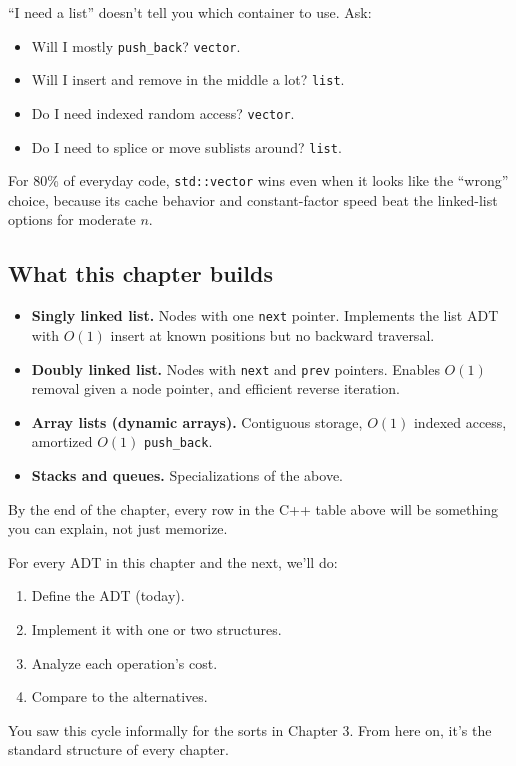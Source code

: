 \documentclass[11pt]{article}
\begin{document}
\begin{warnbox}
``I need a list'' doesn't tell you which container to use. Ask:
\begin{itemize}[leftmargin=*]
  \item Will I mostly \texttt{push\_back}? \texttt{vector}.
  \item Will I insert and remove in the middle a lot? \texttt{list}.
  \item Do I need indexed random access? \texttt{vector}.
  \item Do I need to splice or move sublists around? \texttt{list}.
\end{itemize}
For 80\% of everyday code, \texttt{std::vector} wins even when it
looks like the ``wrong'' choice, because its cache behavior and
constant-factor speed beat the linked-list options for moderate $n$.
\end{warnbox}

\subsection{What this chapter builds}

\begin{ideabox}
\begin{itemize}[leftmargin=*]
  \item \textbf{Singly linked list.} Nodes with one \texttt{next}
        pointer. Implements the list ADT with $O(1)$ insert at
        known positions but no backward traversal.
  \item \textbf{Doubly linked list.} Nodes with \texttt{next} and
        \texttt{prev} pointers. Enables $O(1)$ removal given a
        node pointer, and efficient reverse iteration.
  \item \textbf{Array lists (dynamic arrays).} Contiguous storage,
        $O(1)$ indexed access, amortized $O(1)$ \texttt{push\_back}.
  \item \textbf{Stacks and queues.} Specializations of the above.
\end{itemize}
By the end of the chapter, every row in the C++ table above will be
something you can explain, not just memorize.
\end{ideabox}

\begin{notebox}
For every ADT in this chapter and the next, we'll do:
\begin{enumerate}[leftmargin=*]
  \item Define the ADT (today).
  \item Implement it with one or two structures.
  \item Analyze each operation's cost.
  \item Compare to the alternatives.
\end{enumerate}
You saw this cycle informally for the sorts in Chapter 3. From here
on, it's the standard structure of every chapter.
\end{notebox}
\end{document}
